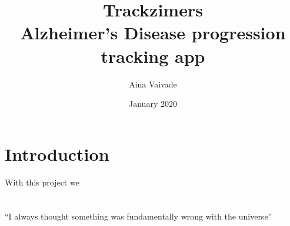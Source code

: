\documentclass{article}
\title{%
  Trackzimers \\
  \large  Alzheimer’s Disease progression tracking app}
\author{Aina Vaivade}
\date{January 2020}
\begin{document}
\maketitle

\section{Introduction}
With this project we 

\section{}
``I always thought something was fundamentally wrong with the universe'' \citep{adams1995hitchhiker}



\end{document}
